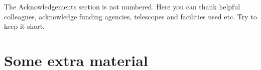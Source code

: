 \documentclass[a4paper,fleqn,usenatbib]{mnras}
\begin{document}
The Acknowledgements section is not numbered. Here you can thank helpful
colleagues, acknowledge funding agencies, telescopes and facilities used etc.
Try to keep it short.










\appendix

\section{Some extra material}


\bsp	%
\label{lastpage}
\end{document}
